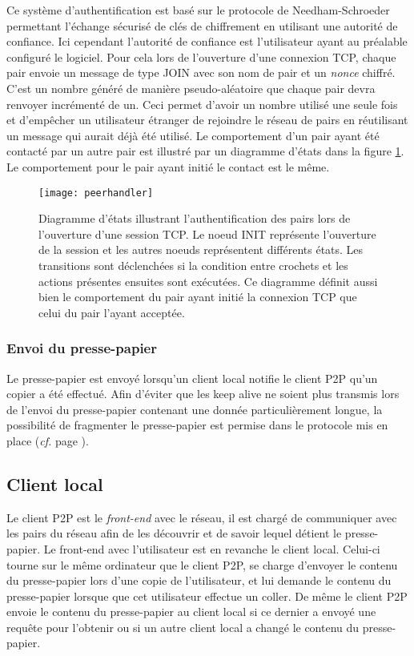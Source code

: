 Ce système d'authentification est basé sur le protocole de
Need\-ham-Schroe\-der
\cite{1978Needham} permettant l'échange sécurisé de clés de chiffrement
en utilisant une autorité de confiance. Ici cependant l'autorité de confiance
est l'utilisateur ayant au préalable configuré le logiciel.
Pour cela lors de l'ouverture d'une connexion TCP, chaque
pair envoie un message de type JOIN avec son nom de pair et un
\emph{nonce} chiffré. C'est un nombre généré de manière pseudo-aléatoire que
chaque pair devra renvoyer incrémenté de un. Ceci permet d'avoir un nombre
utilisé une seule fois et d'empêcher un utilisateur étranger
de rejoindre le réseau de pairs en réutilisant un message qui aurait déjà
été utilisé. Le comportement d'un pair ayant été contacté par un autre pair
est illustré par un diagramme d'états dans la figure \ref{fig:peerhandler}.
Le comportement pour le pair ayant initié le contact est le même.

\begin{figure}[!h]
  \centering
  \texttt{[image: peerhandler]}
  \caption{Diagramme d'états illustrant l'authentification des pairs lors
    de l'ouverture d'une session TCP. Le noeud INIT représente l'ouverture
    de la session et les autres noeuds représentent différents états. Les
    transitions sont déclenchées si la condition entre crochets et les actions
    présentes ensuites sont exécutées. Ce diagramme définit aussi bien le
    comportement du pair ayant initié la connexion TCP que celui du pair
    l'ayant acceptée.}
  \label{fig:peerhandler}
\end{figure}

\subsubsection{Envoi du presse-papier}
Le presse-papier est envoyé lorsqu'un client local notifie le client
P2P qu'un copier a été effectué.
Afin d'éviter que les keep alive ne soient plus transmis lors
de l'envoi du presse-papier contenant une donnée particulièrement
longue, la possibilité de fragmenter le presse-papier est permise dans
le protocole mis en place (\emph{cf.} page \pageref{msg:data_p2p}).

\subsection{Client local}
Le client P2P est le \emph{front-end} avec le réseau, il est chargé
de communiquer avec les pairs du réseau afin de les découvrir et de savoir
lequel détient le presse-papier. Le front-end avec l'utilisateur
est en revanche le client local. Celui-ci tourne sur le même ordinateur
que le client P2P, se charge d'envoyer le contenu du presse-papier
lors d'une copie de l'utilisateur, et lui demande le contenu du presse-papier
lorsque que cet utilisateur effectue un coller.
De même le client P2P envoie le contenu du presse-papier au client local si
ce dernier a envoyé une requête pour l'obtenir ou si un autre
client local a changé le contenu du presse-papier.

